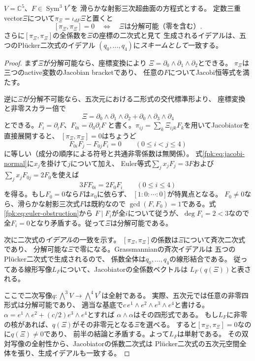 \begin{theorem}
\label{fpk:thm:plucker-obstruction}
$V=\mathbb C^5$、$F\in\operatorname{Sym}^3V^*$を
滑らかな射影三次超曲面の方程式とする。
定数三重vector$\Xi$について$\pi_\Xi=\iota_{dF}\Xi$と置くと
\[
 [\pi_\Xi,\pi_\Xi]=0
 \quad\Longleftrightarrow\quad
 \Xi\text{は分解可能（零を含む）}.
\]
さらに$[\pi_\Xi,\pi_\Xi]$の全係数を$\Xi$の座標の二次式と見て
生成されるイデアルは、五つのPl\"ucker二次式のイデアル
$(q_0,\ldots,q_4)$に\emph{スキームとして}一致する。
\end{theorem}
\begin{proof}
まず$\Xi$が分解可能なら、座標変換により
$\Xi=\partial_0\wedge\partial_1\wedge\partial_2$とできる。
$\pi_\Xi$は三つのactive変数のJacobian bracketであり、
任意の$F$についてJacobi恒等式を満たす。

逆に$\Xi$が分解不可能なら、五次元における二形式の交代標準形より、
座標変換と非零スカラー倍で
\[
 \Xi=\partial_0\wedge\partial_1\wedge\partial_2+
       \partial_0\wedge\partial_3\wedge\partial_4
\]
とできる。$F_i=\partial_iF$、$F_{0i}=\partial_0\partial_iF$
と書く。$\pi_{ij}=\sum_k\Xi_{ijk}F_k$を用いてJacobiatorを直接展開すると、
$[\pi_\Xi,\pi_\Xi]=0$はちょうど
\begin{equation}\label{fpk:eq:jacobi-normal}
 F_{0i}F_j-F_{0j}F_i=0
 \qquad(0\le i<j\le4)
\end{equation}
に等しい（成分の順序による符号と共通非零係数は無関係）。
式\eqref{fpk:eq:jacobi-normal}に$x_j$を掛けて$j$について加え、
Euler等式$\sum_jx_jF_j=3F$および
$\sum_jx_jF_{0j}=2F_0$を使えば
\begin{equation}\label{fpk:eq:euler-obstruction}
 3F F_{0i}=2F_0F_i
 \qquad(0\le i\le4)
\end{equation}
を得る。もし$F_0=0$なら$F$は$x_0$に依らず、
$[1:0:\cdots:0]$が特異点となる。
$F_0\ne0$なら、滑らかな射影三次式$F$は既約なので
$\gcd(F,F_0)=1$である。式\eqref{fpk:eq:euler-obstruction}から
$F\mid F_i$が全$i$について従うが、$\deg F_i=2<3$なので
全$F_i=0$となり矛盾する。従って$\Xi$は分解可能である。

次に二次式の\emph{イデアル}の一致を示す。
$[\pi_\Xi,\pi_\Xi]$の係数は$\Xi$について斉次二次式であり、
分解可能な$\Xi$で零になる。Grassmannianの斉次イデアルは
五つのPl\"ucker二次式で生成されるので、
係数全体は$q_0,\ldots,q_4$の線形結合である。
従ってある線形写像$L_F$について、Jacobiatorの全係数ベクトルは
$L_F(q(\Xi))$と表される。

ここで二次写像$q:\bigwedge^3V\to\bigwedge^4V^*$は全射である。
実際、五次元では任意の非零四形式は分解可能であり、
適当な基底で$c\,e^1\wedge e^2\wedge e^3\wedge e^4$と書ける。
$\alpha=e^1\wedge e^2+(c/2)e^3\wedge e^4$とすれば
$\alpha\wedge\alpha$はその四形式である。
もし$L_F$に非零の核があれば、$q(\Xi)$がその非零元となる$\Xi$を選べる。
すると$[\pi_\Xi,\pi_\Xi]=0$なのに$q(\Xi)\ne0$であり、
前半の結論と矛盾する。よって$L_F$は単射である。
その双対写像の全射性から、Jacobiatorの係数二次式は
Pl\"ucker二次式の五次元空間全体を張り、生成イデアルも一致する。
\end{proof}

